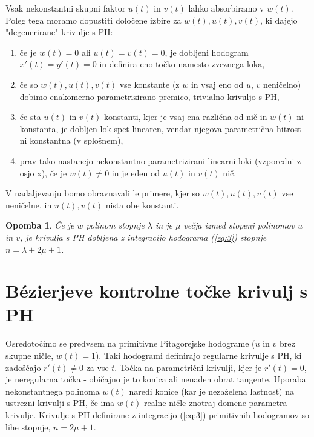 \documentclass[a4paper]{article}
\newtheorem{remark}{Opomba}
\begin{document}
	Vsak nekonstantni skupni faktor $u (t)$ in $v (t)$ lahko absorbiramo v $w (t)$. Poleg tega moramo dopustiti določene izbire za $w (t), u (t), v (t)$, ki dajejo "degenerirane" krivulje s PH:
	\begin{enumerate}
		\item če je $w (t) = 0$ ali $u (t) = v (t) = 0$, je dobljeni hodogram $x\prime (t) = y\prime (t) = 0$ in definira eno točko namesto zveznega loka,
		\item če so $w (t), u (t), v (t)$ vse konstante (z $w$ in vsaj eno od $u$, $v$ neničelno) dobimo enakomerno parametrizirano premico, trivialno krivuljo s PH,
		\item če sta $u (t)$ in $v (t)$ konstanti, kjer je vsaj ena različna od nič in $w (t)$ ni konstanta, je dobljen lok spet linearen, vendar njegova parametrična hitrost ni konstantna (v splošnem),
		\item prav tako nastanejo nekonstantno parametrizirani linearni loki (vzporedni z osjo x), če je $w (t)\not = 0$ in je eden od $u (t)$ in $v (t)$ nič.
	\end{enumerate}
	V nadaljevanju bomo obravnavali le primere, kjer so $w (t), u (t), v (t)$ vse neničelne,
	in $u (t), v (t)$ nista obe konstanti.
	\begin{remark}
		Če je $w$ polinom stopnje $\lambda$ in je $\mu$ večja izmed stopenj polinomov $u$ in $v$, je krivulja s PH dobljena z integracijo hodograma (\ref{eq:3}) stopnje $n = \lambda + 2\mu+ 1$.
	\end{remark}

	\section{B\'ezierjeve kontrolne točke krivulj s PH}
	Osredotočimo se predvsem na primitivne Pitagorejske hodograme ($u$ in $v$ brez skupne ničle, $w(t)=1$). Taki hodogrami definirajo regularne krivulje s PH, ki zadoščajo $r\prime (t)\not = 0$ za vse $t$. Točka na parametrični krivulji, kjer je $r\prime (t)=0$, je neregularna točka - običajno je to konica ali nenaden obrat tangente. Uporaba nekonstantnega polinoma $w (t)$ naredi konice (kar je nezaželena lastnost) na ustrezni krivulji s PH, če ima $w (t)$ realne ničle znotraj domene parametra krivulje. Krivulje s PH definirane z integracijo (\ref{eq:3}) primitivnih hodogramov so lihe stopnje, $n = 2\mu + 1$.
	
\end{document}
